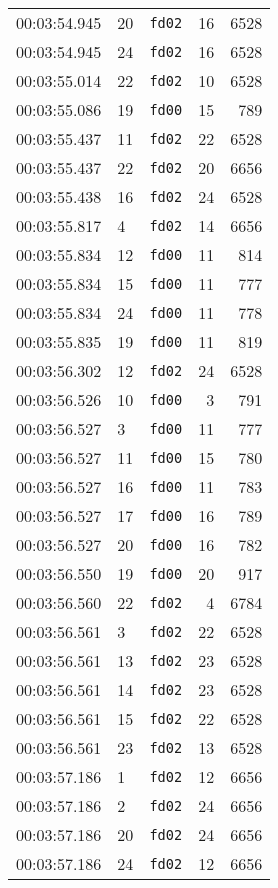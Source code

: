 \documentclass{article}
\begin{document}
\begin{longtable}{lllrr}
00:03:54.945 & 20 & \texttt{fd02} & 16 & 6528 \\
00:03:54.945 & 24 & \texttt{fd02} & 16 & 6528 \\
00:03:55.014 & 22 & \texttt{fd02} & 10 & 6528 \\
00:03:55.086 & 19 & \texttt{fd00} & 15 & 789 \\
00:03:55.437 & 11 & \texttt{fd02} & 22 & 6528 \\
00:03:55.437 & 22 & \texttt{fd02} & 20 & 6656 \\
00:03:55.438 & 16 & \texttt{fd02} & 24 & 6528 \\
00:03:55.817 & 4 & \texttt{fd02} & 14 & 6656 \\
00:03:55.834 & 12 & \texttt{fd00} & 11 & 814 \\
00:03:55.834 & 15 & \texttt{fd00} & 11 & 777 \\
00:03:55.834 & 24 & \texttt{fd00} & 11 & 778 \\
00:03:55.835 & 19 & \texttt{fd00} & 11 & 819 \\
00:03:56.302 & 12 & \texttt{fd02} & 24 & 6528 \\
00:03:56.526 & 10 & \texttt{fd00} & 3 & 791 \\
00:03:56.527 & 3 & \texttt{fd00} & 11 & 777 \\
00:03:56.527 & 11 & \texttt{fd00} & 15 & 780 \\
00:03:56.527 & 16 & \texttt{fd00} & 11 & 783 \\
00:03:56.527 & 17 & \texttt{fd00} & 16 & 789 \\
00:03:56.527 & 20 & \texttt{fd00} & 16 & 782 \\
00:03:56.550 & 19 & \texttt{fd00} & 20 & 917 \\
00:03:56.560 & 22 & \texttt{fd02} & 4 & 6784 \\
00:03:56.561 & 3 & \texttt{fd02} & 22 & 6528 \\
00:03:56.561 & 13 & \texttt{fd02} & 23 & 6528 \\
00:03:56.561 & 14 & \texttt{fd02} & 23 & 6528 \\
00:03:56.561 & 15 & \texttt{fd02} & 22 & 6528 \\
00:03:56.561 & 23 & \texttt{fd02} & 13 & 6528 \\
00:03:57.186 & 1 & \texttt{fd02} & 12 & 6656 \\
00:03:57.186 & 2 & \texttt{fd02} & 24 & 6656 \\
00:03:57.186 & 20 & \texttt{fd02} & 24 & 6656 \\
00:03:57.186 & 24 & \texttt{fd02} & 12 & 6656 \\

\end{longtable}
\end{document}
